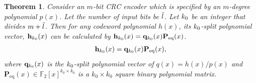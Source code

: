 \documentclass [PhD] {uclathes}
\newtheorem{theorem}{Theorem}
\begin{document}
\begin{theorem}
    Consider an $m$-bit CRC encoder which is specified by an $m$-degree polynomial $p(x)$. Let the number of input bits be $\Tilde{l}$. Let $k_0$ be an integer that divides $m+\Tilde{l}$. Then for any codeword polynomial $h(x)$, its $k_0$-split polynomial vector, $\mathbf{h}_{k_0}(x)$ can be calculated by $\mathbf{h}_{k_0}(x) = \mathbf{q}_{k_0}(x) \mathbf{P}_{\mathrm{eq}}(x)$.
    \begin{align}
        \mathbf{h}_{k_0}(x) = \mathbf{q}_{k_0}(x) \mathbf{P}_{\mathrm{eq}}(x),
    \end{align}
    where $\mathbf{q}_{k_0}(x)$ is the $k_0$-split polynomial vector of $q(x)=h(x)/p(x)$  and $\mathbf{P}_{\mathrm{eq}}(x)\in\mathbb{F}_2[x]^{k_0\times k_0}$ is a $k_0\times k_0$ square binary polynomial matrix.
\end{theorem}
\end{document}
